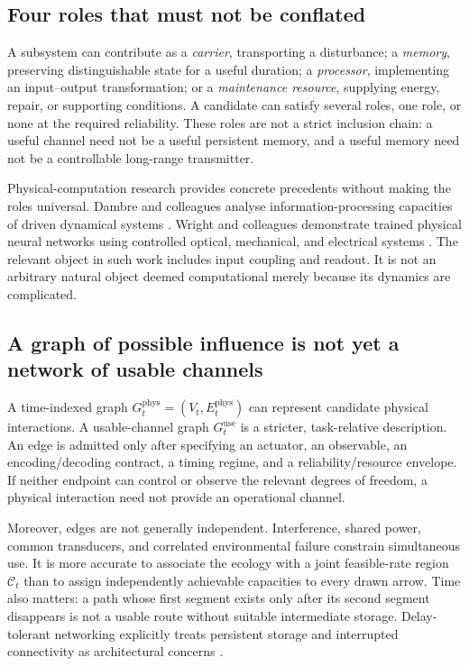 \documentclass[11pt,a4paper]{article}
\theoremstyle{definition}
\theoremstyle{remark}
\begin{document}
\subsection{Four roles that must not be conflated}
A subsystem can contribute as a \emph{carrier}, transporting a disturbance; a \emph{memory}, preserving distinguishable state for a useful duration; a \emph{processor}, implementing an input--output transformation; or a \emph{maintenance resource}, supplying energy, repair, or supporting conditions. A candidate can satisfy several roles, one role, or none at the required reliability. These roles are not a strict inclusion chain: a useful channel need not be a useful persistent memory, and a useful memory need not be a controllable long-range transmitter.

Physical-computation research provides concrete precedents without making the roles universal. Dambre and colleagues analyse information-processing capacities of driven dynamical systems \citep{dambre}. Wright and colleagues demonstrate trained physical neural networks using controlled optical, mechanical, and electrical systems \citep{wright}. The relevant object in such work includes input coupling and readout. It is not an arbitrary natural object deemed computational merely because its dynamics are complicated.

\subsection{A graph of possible influence is not yet a network of usable channels}
A time-indexed graph $G_t^{\mathrm{phys}}=(V_t,E_t^{\mathrm{phys}})$ can represent candidate physical interactions. A usable-channel graph $G_t^{\mathrm{use}}$ is a stricter, task-relative description. An edge is admitted only after specifying an actuator, an observable, an encoding/decoding contract, a timing regime, and a reliability/resource envelope. If neither endpoint can control or observe the relevant degrees of freedom, a physical interaction need not provide an operational channel.

Moreover, edges are not generally independent. Interference, shared power, common transducers, and correlated environmental failure constrain simultaneous use. It is more accurate to associate the ecology with a joint feasible-rate region $\mathscr C_t$ than to assign independently achievable capacities to every drawn arrow. Time also matters: a path whose first segment exists only after its second segment disappears is not a usable route without suitable intermediate storage. Delay-tolerant networking explicitly treats persistent storage and interrupted connectivity as architectural concerns \citep{dtn}.
\end{document}

